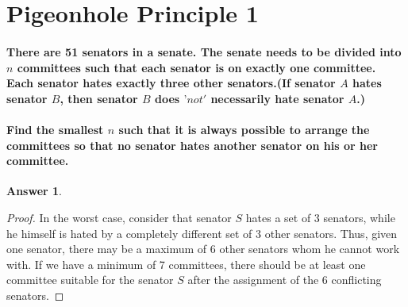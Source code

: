\documentclass{article}
\renewcommand{\(}{\left(}
\renewcommand{\)}{\right)}
\theoremstyle{plain}
\theoremstyle{plain}
\theoremstyle{definition}
\newtheorem*{answer}{Answer}
\begin{document}
\section{Pigeonhole Principle 1}
\paragraph*{
There are 51 senators in a senate. The senate needs to be divided into $n$ committees such that each senator is on exactly one committee. Each senator hates exactly three other senators.(If senator $A$ hates senator $B$, then senator $B$ does $’not'$ necessarily hate senator $A$.)
}
\paragraph*{
Find the smallest $n$ such that it is always possible to arrange the committees so that no senator hates another senator on his or her committee.
}
\begin{shaded}
\begin{answer}
\begin{proof}
In the worst case, consider that senator $S$ hates a set of 3 senators, while he himself is hated by a completely different set of 3 other senators. Thus, given one senator, there may be a maximum of 6 other senators whom he cannot work with. If we have a minimum of 7 committees, there should be at least one committee suitable for the senator $S$ after the assignment of the 6 conflicting senators.
\end{proof}
\end{answer}
\end{shaded}
\end{document}
